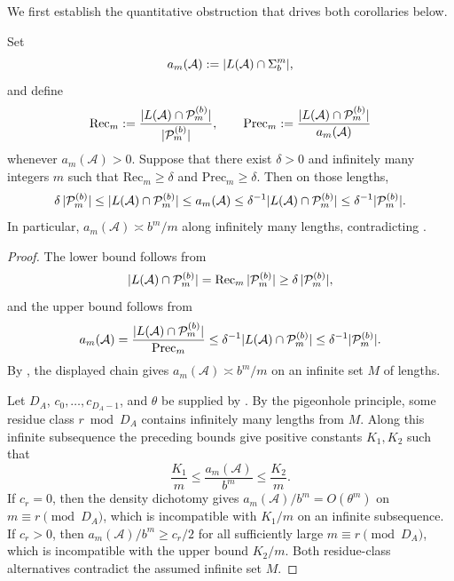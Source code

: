 We first establish the quantitative obstruction that drives both
corollaries below.

\begin{proposition}
  \label{prop:dfa-quantitative-obstruction}
  Set
  \[
    a_m(\mathcal A):=\lvert L(\mathcal A)\cap\Sigma_b^m \rvert,
  \]
  and define
  \[
    \mathrm{Rec}_m
    :=\frac{\lvert L(\mathcal A)\cap\mathcal P_m^{(b)} \rvert}{\lvert \mathcal P_m^{(b)} \rvert},
    \qquad
    \mathrm{Prec}_m
    :=\frac{\lvert L(\mathcal A)\cap\mathcal P_m^{(b)} \rvert}{a_m(\mathcal A)}
  \]
  whenever \(a_m(\mathcal A)>0\). Suppose that there exist \(\delta>0\)
  and infinitely many integers \(m\) such that
  \(\mathrm{Rec}_m\ge \delta\) and \(\mathrm{Prec}_m\ge \delta\). Then
  on those lengths,
  \[
    \delta\,\lvert \mathcal P_m^{(b)} \rvert
    \le \lvert L(\mathcal A)\cap\mathcal P_m^{(b)} \rvert
    \le a_m(\mathcal A)
    \le \delta^{-1}\lvert L(\mathcal A)\cap\mathcal P_m^{(b)} \rvert
    \le \delta^{-1}\lvert \mathcal P_m^{(b)} \rvert.
  \]
  In particular, \(a_m(\mathcal A)\asymp b^m/m\) along infinitely many
  lengths, contradicting .
\end{proposition}

\begin{proof}
  The lower bound follows from
  \[
    \lvert L(\mathcal A)\cap\mathcal P_m^{(b)} \rvert
    =\mathrm{Rec}_m\,\lvert \mathcal P_m^{(b)} \rvert
    \ge \delta\,\lvert \mathcal P_m^{(b)} \rvert,
  \]
  and the upper bound follows from
  \[
    a_m(\mathcal A)
    =\frac{\lvert L(\mathcal A)\cap\mathcal P_m^{(b)} \rvert}{\mathrm{Prec}_m}
    \le \delta^{-1}\lvert L(\mathcal A)\cap\mathcal P_m^{(b)} \rvert
    \le \delta^{-1}\lvert \mathcal P_m^{(b)} \rvert.
  \]
  By , the displayed chain gives
  \(a_m(\mathcal A)\asymp b^m/m\) on an infinite set \(M\) of lengths.

  Let \(D_A\), \(c_0,\dots,c_{D_A-1}\), and \(\theta\) be supplied by
  . By the pigeonhole principle, some
  residue class \(r\bmod D_A\) contains infinitely many lengths from
  \(M\). Along this infinite subsequence the preceding bounds give
  positive constants \(K_1,K_2\) such that
  \[
    \frac{K_1}{m}\le \frac{a_m(\mathcal A)}{b^m}
    \le \frac{K_2}{m}.
  \]
  If \(c_r=0\), then the density dichotomy gives
  \(a_m(\mathcal A)/b^m=O(\theta^m)\) on \(m\equiv r\pmod {D_A}\), which is
  incompatible with \(K_1/m\) on an infinite subsequence. If \(c_r>0\),
  then \(a_m(\mathcal A)/b^m\ge c_r/2\) for all sufficiently large
  \(m\equiv r\pmod {D_A}\), which is incompatible with the upper bound
  \(K_2/m\). Both residue-class alternatives contradict the assumed
  infinite set \(M\).
\end{proof}

